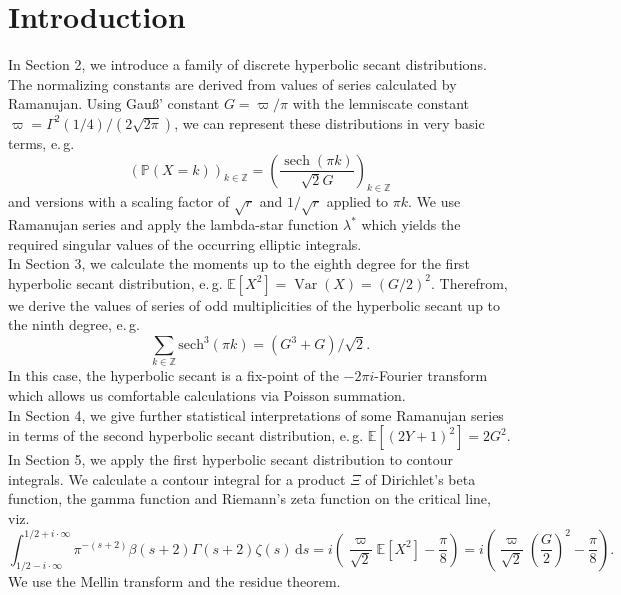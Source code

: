 \documentclass[12pt]{amsart}
\theoremstyle{definition}
\theoremstyle{remark}
\numberwithin{equation}{section}
\newcommand{\1}{\mathbbm{1}}
\begin{document}
\vspace{-0.5cm}

\section{Introduction}

In Section 2, we introduce a family of discrete hyperbolic secant distributions. The normalizing constants are derived from values of series calculated by Ramanujan. Using Gau\ss' constant $G=\varpi/\pi$ with the lemniscate constant $\varpi=\Gamma^2(1/4)/(2\sqrt{2 \pi})$, we can represent these distributions in very basic terms, e.\,g.
$$
\left(\mathbb{P} (X = k)\right)_{k \in \mathbb{Z}} = \left(\frac{\operatorname{sech}\left(\pi k\right)}{\sqrt{2}G} \right)_{k\in\mathbb{Z}}
$$
and versions with a scaling factor of $\sqrt{r}$ and $1/\sqrt{r}$ applied to $\pi k$. We use Ramanujan series and apply the lambda-star function $\lambda^*$ which yields the required singular values of the occurring elliptic integrals.\\

In Section 3, we calculate the moments up to the eighth degree for the first hyperbolic secant distribution, e.\,g. $\mathbb{E}\left[X^2 \right] = \operatorname{Var}(X) = (G/2)^2$. Therefrom, we derive the values of series of odd multiplicities of the hyperbolic secant up to the ninth degree, e.\,g.
$$
\sum_{k\in\mathbb{Z}} \mathrm{sech}^3 (\pi k) = \left(G^3 + G\right)/\sqrt{2}.
$$
In this case, the hyperbolic secant is a fix-point of the $-2\pi i$-Fourier transform which allows us comfortable calculations via Poisson summation.\\

In Section 4, we give further statistical interpretations of some Ramanujan series in terms of the second hyperbolic secant distribution, e.\,g. $\mathbb{E}\left[(2Y+1)^2 \right] = 2G^2$.\\

In Section 5, we apply the first hyperbolic secant distribution to contour integrals. We calculate a contour integral for a product $\Xi$ of Dirichlet's beta function, the gamma function and Riemann's zeta function on the critical line, viz.
$$
\int_{1/2 - i\cdot \infty}^{1/2 + i\cdot \infty} \pi^{-(s+2)} \beta(s+2) \Gamma(s+2) \zeta(s) \, \mathrm{d}s = i \left( \frac{\varpi}{\sqrt{2}} \mathbb{E}\left[X^2 \right] - \frac{\pi}{8} \right) = i \left( \frac{\varpi}{\sqrt{2}} \left(\frac{G}{2}\right)^2 - \frac{\pi}{8} \right).
$$
We use the Mellin transform and the residue theorem.
\end{document}
